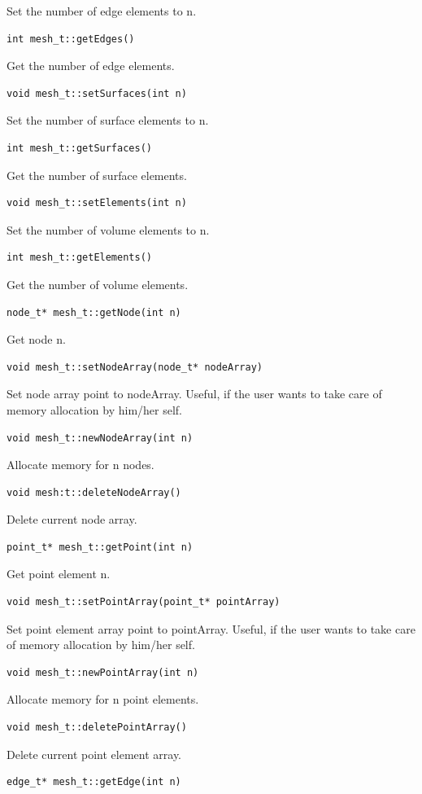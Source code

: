 \documentclass[a4paper,12pt]{article}
\begin{document}
Set the number of edge elements to n.
\begin{verbatim}   
int mesh_t::getEdges()
\end{verbatim}
Get the number of edge elements.
\begin{verbatim} 
void mesh_t::setSurfaces(int n)
\end{verbatim}
Set the number of surface elements to n.
\begin{verbatim} 
int mesh_t::getSurfaces()
\end{verbatim}
Get the number of surface elements.
\begin{verbatim} 
void mesh_t::setElements(int n)
\end{verbatim}
Set the number of volume elements to n.
\begin{verbatim} 
int mesh_t::getElements()
\end{verbatim}
Get the number of volume elements.
\begin{verbatim} 
node_t* mesh_t::getNode(int n)
\end{verbatim}
Get node n.
\begin{verbatim} 
void mesh_t::setNodeArray(node_t* nodeArray)
\end{verbatim}
Set node array point to nodeArray. Useful, if the user wants to take care of memory allocation by him/her self.
\begin{verbatim} 
void mesh_t::newNodeArray(int n)
\end{verbatim}
Allocate memory for n nodes.
\begin{verbatim}
void mesh:t::deleteNodeArray()
\end{verbatim}
Delete current node array.
\begin{verbatim}
point_t* mesh_t::getPoint(int n)
\end{verbatim}
Get point element n.
\begin{verbatim}
void mesh_t::setPointArray(point_t* pointArray)
\end{verbatim}
Set point element array point to pointArray. Useful, if the user wants to take care of memory allocation by him/her self.
\begin{verbatim} 
void mesh_t::newPointArray(int n)
\end{verbatim}
Allocate memory for n point elements.
\begin{verbatim}
void mesh_t::deletePointArray()
\end{verbatim}
Delete current point element array.
\begin{verbatim}
edge_t* mesh_t::getEdge(int n)
\end{verbatim}
\end{document}
